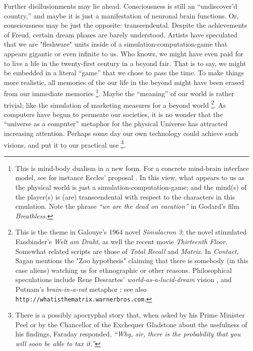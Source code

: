 \documentclass[pre,preprint,showpacs,showkeys,amsfonts]{revtex4}
\begin{document}
Further disillusionments may lie ahead.
Consciousness is still an  ``undiscover'd country,''
and maybe it is just a manifestation of neuronal brain functions.
Or, consciousness may be just the opposite: transcendental.
Despite the achievements of Freud, certain dream phases are barely understood.
Artists have
speculated that we are "fleshware"
units inside of a simulation-computation-game
that appears gigantic or even infinite to us.
Who knows, we might have even paid for to live
a life in the twenty-first century in a beyond fair.
That is to say, we might be embedded in a literal ``game''
that we chose to pass the time.
 To make things more realistic,
all memories of the our life in the
beyond might have been erased from our immediate memories
\footnote{
This is mind-body dualism in a new form.
For a concrete mind-brain interface model, see
for instance Eccles' proposal \cite{eccles:papal}.
In this view, what appears to us as the physical world
is just a simulation-computation-game; and the mind(s) of the player(s) is (are) transcendental
with respect to the characters in this emulation.
Note the phrase {\it ``we are the dead on vacation''} in  Godard's  film
{\it Breathless.}}.
Maybe the ``meaning'' of our world  is rather trivial; like the simulation of marketing
measures for a beyond world
\footnote{
This is the theme in
Galouye's  1964 novel {\it Simulacron 3};
the novel stimulated Fassbinder's {\it Welt am Draht}, as well the recent movie
{\it Thirteenth Floor}.
Somewhat related scripts are those of {\it Total Recall} and
{\it Matrix}.
In {\it Contact,} Sagan  mentions the "Zoo hypothesis" claiming
that there is somebody (in this case aliens) watching us
for ethnographic or other reasons.
Philosophical speculations include
Rene Descartes' {\it world-as-a-lucid-dream} vision \cite[Meditation 1,9]{descartes-meditation},
and Putnam's {\it brain-in-a-vat} metaphor \cite{putnam:81}; see also
{\tt http://whatisthematrix.warnerbros.com}.
}.
As computers have begun to permeate our societies,
it is no wonder that
the ``universe as a computer'' metaphor for the physical
Universe has attracted increasing attention.
Perhaps some day our own technology could achieve such visions,
and put it to our practical use
\footnote{
There is a possibly apocryphal story \cite[p. 127]{Thomas} that, when asked by his Prime Minister
Peel or  by the Chancellor of the Exchequer  Gladstone about the usefulness of his findings,
Faraday responded,
{\it ``Why, sir, there is the probability that you will soon be able to tax it.''}
}.
\end{document}
